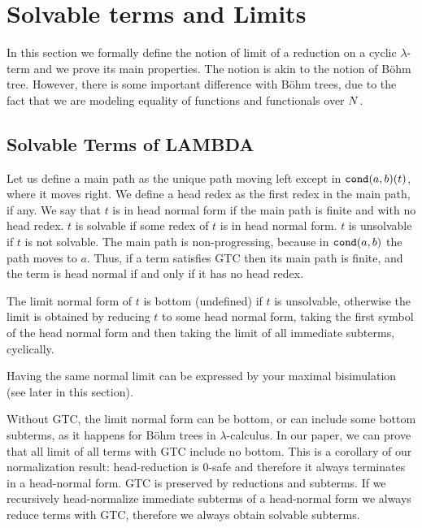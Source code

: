 \newcommand\Lim[1]{{\tt Lim}(#1)}
\newcommand{\NFZ}{{\tt NF}_0}

\section{Solvable terms and Limits}

In this section we formally define the notion of limit of a reduction on a cyclic 
$\lambda$-term and we prove its main properties. The notion is akin to the notion
of B\"{o}hm tree. However, there is some important difference with B\"{o}hm trees,
due to the fact that we are modeling equality of functions and functionals over ${N}$. 


\subsection{Solvable Terms of LAMBDA}
      Let us define a main path as the unique path moving left except in ${\tt cond}(a,b)(t)$, where it 
moves right. We define a head redex as the first redex in the main path, if any. 
We say that $t$ is in head normal form if the main path is finite and with no head redex. 
$t$ is solvable if some redex of $t$ is in 
head normal form. $t$ is unsolvable if $t$ is not solvable. The main path is non-progressing,
because in ${\tt cond}(a,b)$ the path moves to $a$. 
Thus, if a term satisfies GTC then its main path is finite,
and the term is head normal if and only if it has no head redex.
 
The limit normal form of $t$ is bottom (undefined) if $t$ is unsolvable, otherwise the limit is obtained by reducing $t$ to some head normal form, taking the first symbol of the head normal form and then taking the limit of all immediate subterms, cyclically. 

Having the same normal limit can be expressed by your maximal bisimulation (see later
      in this section).
 
      Without GTC, the limit normal form can be bottom, or can include some bottom subterms, as it happens for B\"{o}hm trees in $\lambda $-calculus.  In our paper, we can prove that all limit of all terms with GTC include no bottom. This is a corollary of our normalization result: head-reduction is 0-safe and therefore it always terminates in a head-normal form. GTC is preserved by reductions and subterms. If we recursively head-normalize immediate subterms of a head-normal form we always reduce terms with GTC, therefore we always obtain solvable subterms.
 
